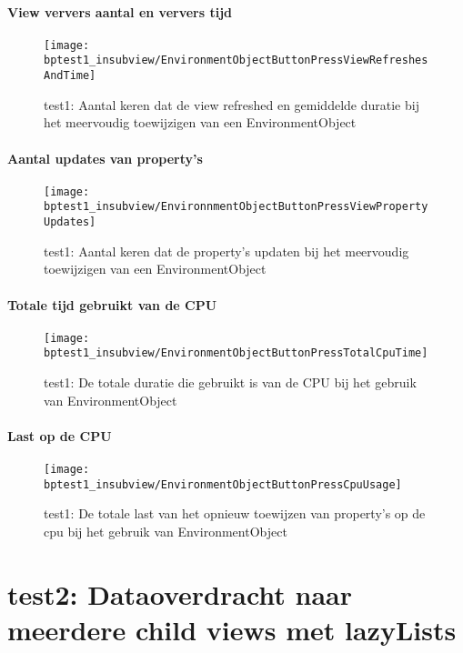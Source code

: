 \paragraph{View ververs aantal en ververs tijd}
\begin{figure}[H]
    \centering
    \texttt{[image: bptest1\_insubview/EnvironmentObjectButtonPressViewRefreshesAndTime]} 
    \caption{test1: Aantal keren dat de view refreshed en gemiddelde duratie bij het meervoudig toewijzigen van een EnvironmentObject}
    \label{fig:viewRefresheEnvironmentObject1}
\end{figure}
\paragraph{Aantal updates van property's}
\begin{figure}[H]
    \centering
    \texttt{[image: bptest1\_insubview/EnvironnmentObjectButtonPressViewPropertyUpdates]} 
    \caption{test1: Aantal keren dat de property's updaten bij het meervoudig toewijzigen van een EnvironmentObject}
    \label{fig:propertyUpdatesEnvironmentObject1}
\end{figure}
\paragraph{Totale tijd gebruikt van de CPU}
\begin{figure}[H]
    \centering
    \texttt{[image: bptest1\_insubview/EnvironmentObjectButtonPressTotalCpuTime]} 
    \caption{test1: De totale duratie die gebruikt is van de CPU bij het gebruik van EnvironmentObject}
    \label{fig:cpuUsageTimeEnvironmentObject1}
\end{figure}
\paragraph{Last op de CPU}
\begin{figure}[H]
    \centering
    \texttt{[image: bptest1\_insubview/EnvironmentObjectButtonPressCpuUsage]} 
    \caption{test1: De totale last van het opnieuw toewijzen van property's op de cpu bij het gebruik van EnvironmentObject}
    \label{fig:cpuWeightEnvironmentObject1}
\end{figure}

\section{test2: Dataoverdracht naar meerdere child views met lazyLists}

